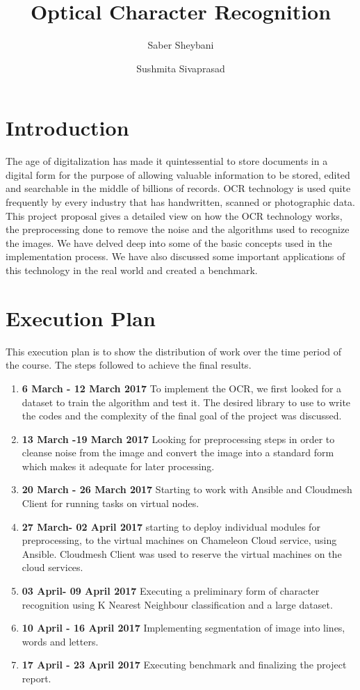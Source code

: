 \documentclass[9pt,twocolumn,twoside]{../../styles/osajnl}
\title{Optical Character Recognition}
\author[1]{Saber Sheybani}
\author[1]{Sushmita Sivaprasad}
\affil[1]{School of Informatics and Computing, Bloomington, IN 47408, U.S.A.}
\affil[*]{Corresponding authors: sheybani@umail.iu.edu,sushsiva@umail.iu.edu}
\begin{document}
\maketitle

\section{Introduction}

The age of digitalization has made it quintessential to store documents
in a digital form for the purpose of allowing valuable information to
be stored, edited and searchable in the middle of billions of
records. OCR technology is used quite frequently by every industry that
has handwritten, scanned or photographic data.  This project proposal
gives a detailed view on how the OCR technology works, the preprocessing done to remove the noise and the
algorithms used to recognize the images. We have delved deep into some of the basic
concepts used in the implementation process. We have also discussed some
important applications of this technology in the real world and created a benchmark.

\section{Execution Plan}
This execution plan is to show the distribution of work over the time
period of the course.  The steps followed to achieve the final results.
\begin{enumerate}
\item {\bfseries 6 March - 12 March 2017} To implement the OCR, we
  first looked for a dataset to train the algorithm and test it.  The
  desired library to use to write the codes and the complexity of the 
  final goal of the project was discussed.
\item{\bfseries 13 March -19 March 2017}
  Looking for preprocessing steps in order to cleanse noise from the
  image and convert the image into a standard form which makes it adequate
  for later processing.
\item {\bfseries 20 March - 26
    March 2017} Starting to work with Ansible and Cloudmesh Client for running
    tasks on virtual nodes.
\item{\bfseries 27 March- 02 April 2017} starting to deploy individual modules
    for preprocessing, to the virtual machines on Chameleon Cloud service,
    using Ansible. Cloudmesh Client was used to reserve the virtual machines 
    on the cloud services.
\item {\bfseries 03 April- 09
    April 2017} Executing a preliminary form of character recognition using
    K Nearest Neighbour classification and a large dataset.
\item {\bfseries 10 April - 16 April 2017}
    Implementing segmentation of image into lines, words and letters.
\item {\bfseries 17 April - 23 April 2017} Executing benchmark and
  finalizing the project report.
\end{enumerate}
\end{document}
